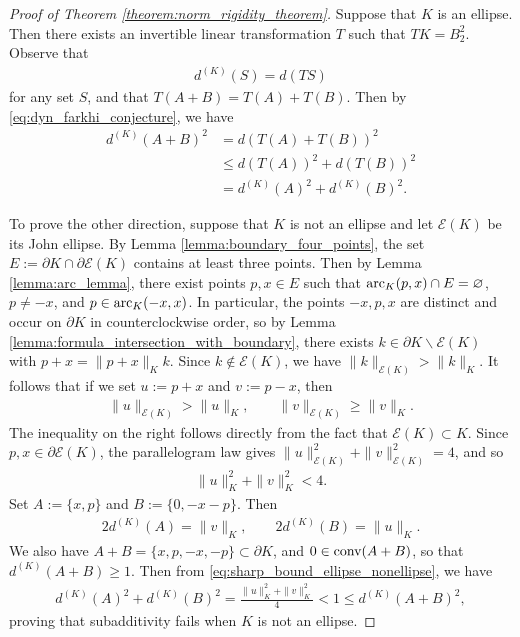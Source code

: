 \documentclass[11pt]{article}
\begin{document}
\begin{proof}[Proof of Theorem \ref{theorem:norm_rigidity_theorem}]
    Suppose that $K$ is an ellipse. Then there exists an invertible linear transformation $T$ such that $TK=B_2^2$. Observe that 
    \begin{align*}
        d^{(K)}(S)=d(TS)
    \end{align*}
    for any set $S$, and that $T(A+B)=T(A)+T(B)$. Then by \eqref{eq:dyn_farkhi_conjecture}, we have
    \begin{align*}
        d^{(K)}(A+B)^2&=d(T(A)+T(B))^2\\
        &\leq d(T(A))^2+d(T(B))^2\\
        &=d^{(K)}(A)^2+d^{(K)}(B)^2.
    \end{align*}

    To prove the other direction, suppose that $K$ is not an ellipse and let $\mathcal{E}(K)$ be its John ellipse. By Lemma \ref{lemma:boundary_four_points}, the set $E:=\partial K\cap \partial \mathcal{E}(K)$ contains at least three points. Then by Lemma \ref{lemma:arc_lemma}, there exist points $p,x\in E$ such that $\textup{arc}_K(p,x)\cap E=\varnothing$, $p\neq -x$, and $p\in \textup{arc}_K(-x,x)$. In particular, the points $-x,p,x$ are distinct and occur on $\partial K$ in counterclockwise order, so by Lemma \ref{lemma:formula_intersection_with_boundary}, there exists $k\in \partial K\backslash \mathcal{E}(K)$ with $p+x=\|p+x\|_Kk$. Since $k\notin \mathcal{E}(K)$, we have $\|k\|_{\mathcal{E}(K)}>\|k\|_K$. It follows that if we set $u:=p+x$ and $v:=p-x$, then
    \begin{align*}
        \|u\|_{\mathcal{E}(K)}>\|u\|_K,\qquad \|v\|_{\mathcal{E}(K)}\geq \|v\|_K.
    \end{align*}
    The inequality on the right follows directly from the fact that $\mathcal{E}(K)\subset K$. Since $p,x\in \partial \mathcal{E}(K)$, the parallelogram law gives $\|u\|_{\mathcal{E}(K)}^2+\|v\|_{\mathcal{E}(K)}^2=4$, and so
    \begin{align}\label{eq:sharp_bound_ellipse_nonellipse}
        \|u\|_K^2+\|v\|_K^2<4.
    \end{align}
    Set $A:=\{x,p\}$ and $B:=\{0,-x-p\}$. Then
    \begin{align*}
        2d^{(K)}(A)=\|v\|_K,\qquad 2d^{(K)}(B)=\|u\|_K.
    \end{align*}
    We also have $A+B=\{x,p,-x,-p\}\subset\partial K$, and $0\in \textup{conv}(A+B)$, so that $d^{(K)}(A+B)\geq 1$. Then from \eqref{eq:sharp_bound_ellipse_nonellipse}, we have
    \begin{align*}
        d^{(K)}(A)^2+d^{(K)}(B)^2=\frac{\|u\|_K^2+\|v\|_K^2}{4}<1\leq d^{(K)}(A+B)^2,
    \end{align*}
    proving that subadditivity fails when $K$ is not an ellipse.
\end{proof}
\end{document}
